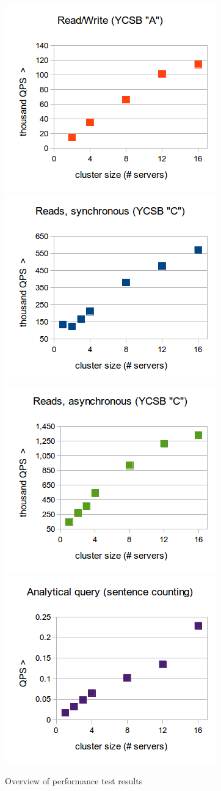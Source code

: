 \begin{figure}[ht]
    \includegraphics[width=.45\linewidth]{img/rethinkperf_rw.png} \quad
    \includegraphics[width=0.45\linewidth]{img/rethinkperf_rsync.png}
    \\[\baselineskip]
    \includegraphics[width=0.45\linewidth]{img/rethinkperf_rasync.png} \quad
    \includegraphics[width=0.45\linewidth]{img/rethinkperf_aquery.png}
    \caption{Overview of performance test results\autocite{rethinkdb:performance}}
    \label{fig:rethink_rethink_performance}
\end{figure}

